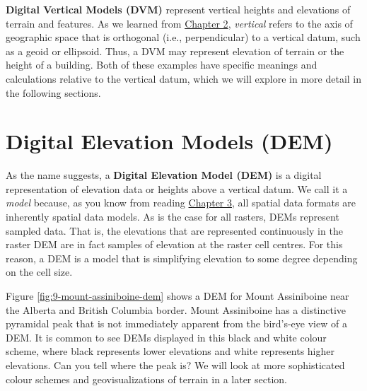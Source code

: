 \documentclass[
]{book}
\begin{document}
\textbf{Digital Vertical Models (DVM)} represent vertical heights and elevations of terrain and features. As we learned from \href{https://ubc-geomatics-textbook.github.io/geomatics-textbook/mapping-data.html}{Chapter 2}, \emph{vertical} refers to the axis of geographic space that is orthogonal (i.e., perpendicular) to a vertical datum, such as a geoid or ellipsoid. Thus, a DVM may represent elevation of terrain or the height of a building. Both of these examples have specific meanings and calculations relative to the vertical datum, which we will explore in more detail in the following sections.

\hypertarget{digital-elevation-models-dem}{%
\section{Digital Elevation Models (DEM)}\label{digital-elevation-models-dem}}

As the name suggests, a \textbf{Digital Elevation Model (DEM)} is a digital representation of elevation data or heights above a vertical datum. We call it a \emph{model} because, as you know from reading \href{https://ubc-geomatics-textbook.github.io/geomatics-textbook/types-of-data.html}{Chapter 3}, all spatial data formats are inherently spatial data models. As is the case for all rasters, DEMs represent sampled data. That is, the elevations that are represented continuously in the raster DEM are in fact samples of elevation at the raster cell centres. For this reason, a DEM is a model that is simplifying elevation to some degree depending on the cell size.

Figure \ref{fig:9-mount-assiniboine-dem} shows a DEM for Mount Assiniboine near the Alberta and British Columbia border. Mount Assiniboine has a distinctive pyramidal peak that is not immediately apparent from the bird's-eye view of a DEM. It is common to see DEMs displayed in this black and white colour scheme, where black represents lower elevations and white represents higher elevations. Can you tell where the peak is? We will look at more sophisticated colour schemes and geovisualizations of terrain in a later section.
\end{document}
